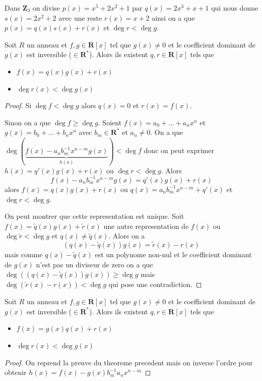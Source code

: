 \begin{example}
Dans $\mathbf{Z}_{3}$ on divise $p(x)=x^{5}+2x^{2}+1$ par $q(x)=2x^{3}+x+1$ qui nous donne $s(x)=2x^{2}+2$ avec une reste $r(x)=x+2$ ainsi on a que $p(x)=q(x)s(x)+r(x)$ et $\deg r<\deg g$.
\end{example}
\begin{theorem}
Soit $R$ un anneau et $f,g\in \mathbf{R}[x]$ tel que $g(x)\neq 0$ et le coefficient dominant de $g(x)$ est inversible ($\in \mathbf{R}^{*}$). Alors ils existent $q,r\in\mathbf{R}[x]$ tels que 
\begin{itemize}
\item $f(x)=q(x)g(x)+r(x)$
\item $\deg r(x) < \deg g(x)$
\end{itemize}
\end{theorem}
\begin{proof}
Si $\deg f <\deg g$ alors $q(x)=0$ et $r(x)=f(x)$.

Sinon on a que $\deg f \geq \deg g$. Soient $f(x)=a_{0}+\dots+a_nx^{n}$ et $g(x)=b_{0}+\dots+b_{n}x^{n}$ avec $b_{m}\in \mathbf{R}^{*}$ et $a_{n}\neq 0$. On a que $\deg(\underbrace{ f(x)-a_{n}b_{m}^{-1}x^{n-m}g(x) }_{ h(x) })<\deg f$ donc on peut exprimer $h(x)=q'(x)g(x)+r(x)$
ou $\deg r<\deg g$. Alors
$$
f(x)-a_{n}b_{m}^{-1}x^{n-m}g(x)=q'(x)g(x)+r(x)
$$
alors $f(x)=q(x)g(x)+r(x)$ ou $q(x)=a_{n}b_{m}^{-1}x^{n-m}+q'(x)$ et $\deg r<\deg g$. 

On peut montrer que cette representation est unique. Soit $f(x)=\tilde{q}(x)g(x)+\tilde{r}(x)$ une autre representation de $f(x)$ ou $\deg \tilde{r}<\deg g$ et $q(x)\neq \tilde{q}(x)$. Alors on a 
$$
(q(x)-\tilde{q}(x))g(x)=\tilde{r}(x)-r(x)
$$
mais comme $q(x)-\tilde{q}(x)$ est un polynome non-nul et le coefficient dominant de $g(x)$ n'est pas un diviseur de zero on a que $\deg((q(x)-\tilde{q}(x))g(x))\geq \deg g$ mais $\deg(\tilde{r}(x)-r(x))<\deg g$ qui pose une contradiction. 
\end{proof}
\begin{theorem}
Soit $R$ un anneau et $f,g\in \mathbf{R}[x]$ tel que $g(x)\neq 0$ et le coefficient dominant de $g(x)$ est inversible ($\in \mathbf{R}^{*}$). Alors ils existent $q,r\in\mathbf{R}[x]$ tels que 
\begin{itemize}
\item $f(x)=g(x)q(x)+r(x)$
\item $\deg r(x) < \deg g(x)$
\end{itemize}
\end{theorem}
\begin{proof}
On reprend la preuve du theoreme precedent mais on inverse l'ordre pour obtenir $h(x)=f(x)-g(x)b_{m}^{-1}a_{n}x^{n-m}$
\end{proof}
